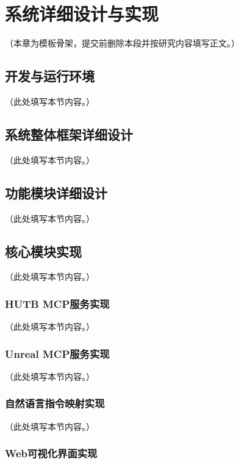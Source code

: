 
\chapter{系统详细设计与实现}

（本章为模板骨架，提交前删除本段并按研究内容填写正文。）

\section{开发与运行环境}

（此处填写本节内容。）

\section{系统整体框架详细设计}

（此处填写本节内容。）

\section{功能模块详细设计}

（此处填写本节内容。）

\section{核心模块实现}

（此处填写本节内容。）

\subsection{HUTB MCP服务实现}

（此处填写本节内容。）

\subsection{Unreal MCP服务实现}

（此处填写本节内容。）

\subsection{自然语言指令映射实现}

（此处填写本节内容。）

\subsection{Web可视化界面实现}

